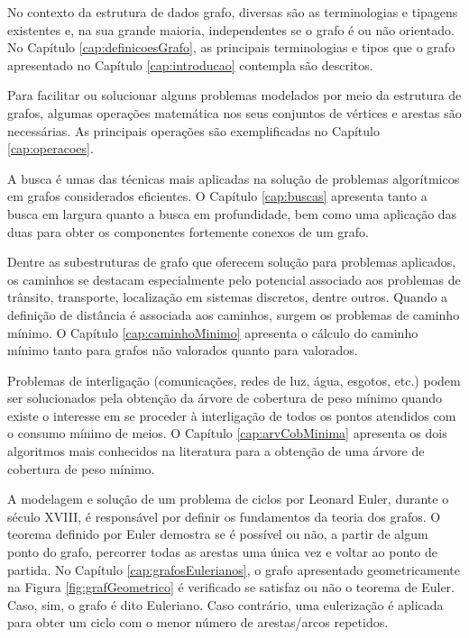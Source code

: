 No contexto da estrutura de dados grafo, diversas são as terminologias e tipagens existentes e, na sua grande maioria, independentes se o grafo é ou não orientado. No Capítulo \ref{cap:definicoesGrafo}, as principais terminologias e tipos que o grafo apresentado no Capítulo \ref{cap:introducao} contempla são descritos.

Para facilitar ou solucionar alguns problemas modelados por meio da estrutura de grafos,  algumas operações matemática nos seus conjuntos de vértices e arestas são necessárias. As principais operações são exemplificadas no Capítulo \ref{cap:operacoes}.

A busca é umas das técnicas mais aplicadas na solução de problemas algorítmicos em grafos considerados eficientes. O Capítulo \ref{cap:buscas} apresenta tanto a busca em largura quanto a busca em profundidade, bem como uma aplicação das duas para obter os componentes fortemente conexos de um grafo.

Dentre as subestruturas de grafo que oferecem solução para problemas aplicados, os caminhos se destacam especialmente pelo potencial associado aos problemas de trânsito, transporte, localização em sistemas discretos, dentre outros. Quando a definição de distância é associada aos caminhos, surgem os problemas de caminho mínimo. O Capítulo \ref{cap:caminhoMinimo} apresenta o cálculo do caminho mínimo tanto para grafos não valorados quanto para valorados.

Problemas de interligação (comunicações, redes de luz, água, esgotos, etc.) podem ser solucionados pela obtenção da árvore de cobertura de peso mínimo quando existe o interesse em se proceder à interligação de todos os pontos atendidos com o consumo mínimo de meios. O Capítulo \ref{cap:arvCobMinima} apresenta os dois algoritmos mais conhecidos na literatura para a obtenção de uma árvore de cobertura de peso mínimo.

A modelagem e solução de um problema de ciclos por Leonard Euler, durante o século XVIII, é responsável por definir os fundamentos da teoria dos grafos. O teorema definido por Euler demostra se é possível ou não, a partir de algum ponto do grafo, percorrer todas as arestas uma única vez e voltar ao ponto de partida. No Capítulo \ref{cap:grafosEulerianos}, o grafo apresentado geometricamente na Figura \ref{fig:grafGeometrico} é verificado se satisfaz ou não o teorema de Euler. Caso, sim, o grafo é dito Euleriano. Caso contrário, uma eulerização é aplicada para obter um ciclo com o menor número de arestas/arcos repetidos.


